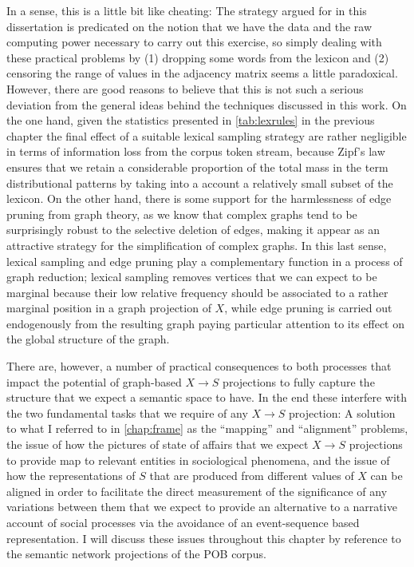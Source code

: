 In a sense, this is a little bit like cheating:
The strategy argued for in this dissertation is predicated on the notion that we have the data and the raw computing power necessary to carry out this exercise, so simply dealing with these practical problems by (1) dropping some words from the lexicon and (2) censoring the range of values in the adjacency matrix seems a little paradoxical.
However, there are good reasons to believe that this is not such a serious deviation from the general ideas behind the techniques discussed in this work.
On the one hand, given the statistics presented in \autoref{tab:lexrules} in the previous chapter the final effect of a suitable lexical sampling strategy are rather negligible in terms of information loss from the corpus token stream, because Zipf's law ensures that we retain a considerable proportion of the total mass in the term distributional patterns by taking into a account a relatively small subset of the lexicon.
On the other hand, there is some support for the harmlessness of edge pruning from graph theory, as we know that complex graphs tend to be surprisingly robust to the selective deletion of edges, making it appear as an attractive strategy for the simplification of complex graphs.
In this last sense, lexical sampling and edge pruning play a complementary function in a process of graph reduction; lexical sampling removes vertices that we can expect to be marginal because their low relative frequency should be associated to a rather marginal position in a graph projection of $X$, while edge pruning is carried out endogenously from the resulting graph paying particular attention to its effect on the global structure of the graph.

There are, however, a number of practical consequences to both processes that impact the potential of graph-based $X \rightarrow S$ projections to fully capture the structure that we expect a semantic space to have.
In the end these interfere with the two fundamental tasks that we require of any $X \rightarrow S$ projection: A solution to what I referred to in \autoref{chap:frame} as the ``mapping'' and ``alignment'' problems, the issue of how the pictures of state of affairs that we expect $X \rightarrow S$ projections to provide map to relevant entities in sociological phenomena, and the issue of how the representations of $S$ that are produced from different values of $X$ can be aligned in order to facilitate the direct measurement of the significance of any variations between them that we expect to provide an alternative to a narrative account of social processes via the avoidance of an event-sequence based representation.
I will discuss these issues throughout this chapter by reference to the semantic network projections of the POB corpus.

